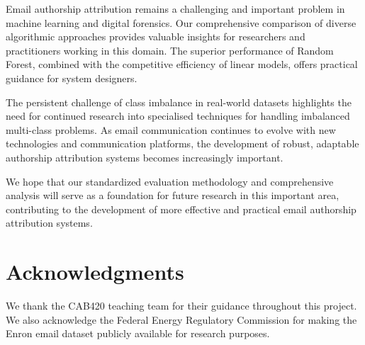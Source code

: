 \documentclass[11pt,a4paper]{article}
\begin{document}
Email authorship attribution remains a challenging and important problem in machine learning and digital forensics. Our comprehensive comparison of diverse algorithmic approaches provides valuable insights for researchers and practitioners working in this domain. The superior performance of Random Forest, combined with the competitive efficiency of linear models, offers practical guidance for system designers.

The persistent challenge of class imbalance in real-world datasets highlights the need for continued research into specialised techniques for handling imbalanced multi-class problems. As email communication continues to evolve with new technologies and communication platforms, the development of robust, adaptable authorship attribution systems becomes increasingly important.

We hope that our standardized evaluation methodology and comprehensive analysis will serve as a foundation for future research in this important area, contributing to the development of more effective and practical email authorship attribution systems.

\section*{Acknowledgments}

We thank the CAB420 teaching team for their guidance throughout this project. We also acknowledge the Federal Energy Regulatory Commission for making the Enron email dataset publicly available for research purposes.
\end{document}

